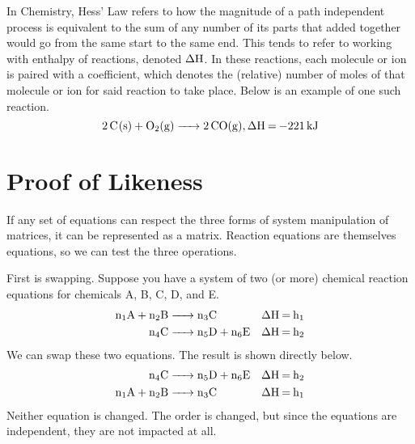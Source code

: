 \documentclass[11pt]{article}
\begin{document}
        In Chemistry, Hess' Law refers to how the magnitude of a path independent process is equivalent to the sum of any number of its parts that added together would go from the same start to the same end.
        This tends to refer to working with enthalpy of reactions, denoted $\rm \Delta H$. 
        In these reactions, each molecule or ion is paired with a coefficient, which denotes the (relative) number of moles of that molecule or ion for said reaction to take place.
        Below is an example of one such reaction.
        \begin{equation}
            \ce{2 C(s) + O2(g) -> 2 CO(g), \Delta H = -221 \unit{\kilo\joule}}
        \end{equation}
        
    \section{Proof of Likeness}
        If any set of equations can respect the three forms of system manipulation of matrices, it can be represented as a matrix.
        Reaction equations are themselves equations, so we can test the three operations.
        
        First is swapping.
        Suppose you have a system of two (or more) chemical reaction equations for chemicals A, B, C, D, and E.
        \begin{align}
            \ce{n_1A + n_2B} & \ce{-> n_3C} & \ce{\Delta H = h_1}\\
            \ce{n_4C} & \ce{-> n_5D + n_6E} & \ce{\Delta H = h_2}
        \end{align}
        We can swap these two equations. The result is shown directly below.
        \begin{align}
            \ce{n_4C} & \ce{-> n_5D + n_6E} & \ce{\Delta H = h_2}\\
            \ce{n_1A + n_2B} & \ce{-> n_3C} & \ce{\Delta H = h_1}
        \end{align}
        Neither equation is changed.
        The order is changed, but since the equations are independent, they are not impacted at all.
        
\end{document}
